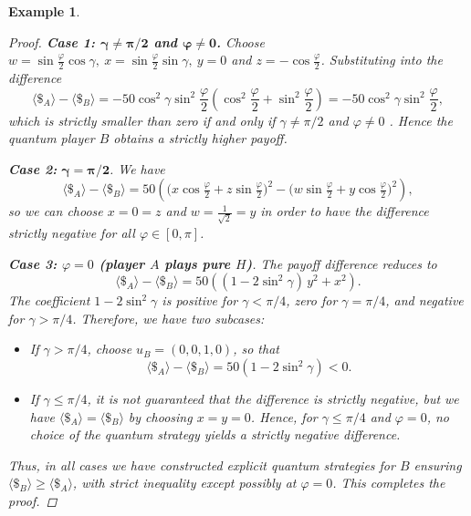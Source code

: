 \documentclass[11pt,a4paper,twoside]{article}
\newtheorem{example}{Example}
\begin{document}
\begin{example}
\begin{proof}
\textbf{Case 1: $\mathbf{\gamma\neq\pi/2}$ and $\mathbf{\varphi\neq 0}$.}
Choose $w=\sin\frac{\varphi}{2}\cos\gamma,\ x=\sin\frac{\varphi}{2}\sin\gamma,\ y=0$ and $z=-\cos\frac{\varphi}{2}$. Substituting into the difference
\begin{equation*}
\langle \$ _A \rangle - \langle \$ _B \rangle = -50\cos^2\gamma\sin^2\frac{\varphi}{2}\left(\cos^2\frac{\varphi}{2}+\sin^2\frac{\varphi}{2}\right) = -50\cos^2\gamma\sin^2\frac{\varphi}{2},
\end{equation*}
which is strictly smaller than zero if and only if $\gamma\neq\pi/2$ and $\varphi\neq 0$ .
Hence the quantum player $B$ obtains a strictly higher payoff.

{\textbf{Case 2:}} $\mathbf{\gamma = \pi/2}$.
We have 
\[
\langle \$ _A \rangle - \langle \$ _B \rangle = 50\left( \bigl(x\cos\tfrac{\varphi}{2} + z\sin\tfrac{\varphi}{2}\bigr)^2
- \bigl(w\sin\tfrac{\varphi}{2}+y \cos\tfrac{\varphi}{2}\bigr)^2\right),
\] so we can choose $x=0=z$ and $w=\frac{1}{\sqrt{2}}=y$ in order to have the difference strictly negative for all $\varphi\in[0,\pi]$.

{\textbf{Case 3: $\varphi = 0$ (player $A$ plays pure $H$)}}. The payoff difference reduces to
\[
\langle \$ _A \rangle - \langle \$ _B \rangle = 50\left( (1 - 2\sin^2\gamma)\, y^2 + x^2 \right).
\]
The coefficient $1 - 2\sin^2\gamma$ is positive for $\gamma < \pi/4$, zero for $\gamma = \pi/4$, and negative for $\gamma > \pi/4$.
Therefore, we have two subcases:
\begin{itemize}
  \item If $\gamma > \pi/4$, choose $u_B=(0,0,1,0)$, so that 
  $$\langle \$ _A \rangle - \langle \$ _B \rangle=50(1 - 2\sin^2\gamma)<0.
  $$
  \item If $\gamma \leq \pi/4$, it is not guaranteed that the difference is strictly negative, but we have $\langle \$ _A \rangle = \langle \$ _B \rangle$ by choosing $x = y = 0$. Hence, for $\gamma \le \pi/4$ and $\varphi = 0$, no choice of the quantum strategy yields a strictly negative difference.
\end{itemize}



Thus, in all cases we have constructed explicit quantum strategies for $B$ ensuring $\langle \$ _B \rangle \ge \langle \$ _A \rangle$, with strict inequality except possibly at $\varphi=0$. This completes the proof.
\end{proof}
\end{example}


\medskip
\end{document}
